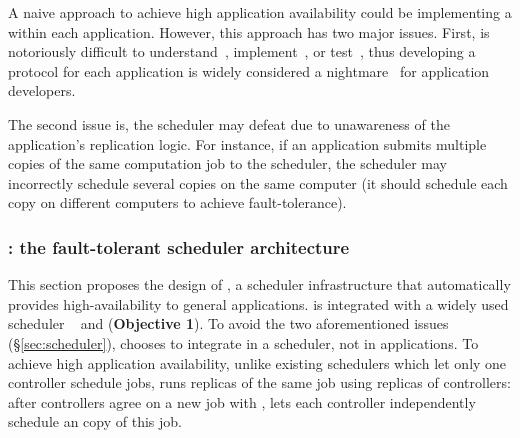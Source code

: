 A naive approach to achieve high application availability could be implementing 
a \paxos within each application. However, this approach has two major issues. 
First, \paxos is notoriously difficult to 
understand~\cite{raft:usenix14,paxos:simple}, implement~\cite{paxos:practical, 
paxos:live}, or test~\cite{modist:nsdi09,demeter:sosp11}, thus developing a 
\paxos protocol for each application is widely considered a 
nightmare~\cite{modist:nsdi09,demeter:sosp11,paxos:live} for application 
developers.

The second issue is, the scheduler may defeat \paxos due to unawareness of the 
application's \paxos replication logic. For instance, if an application submits 
multiple copies of the same computation job to the scheduler, the scheduler may 
incorrectly schedule several copies on the same computer (it should schedule 
each copy on different computers to achieve \paxos fault-tolerance).

\vspace{-.15in}\subsubsection{\tripod: the fault-tolerant scheduler 
architecture} 
\label{sec:scheduler-arch}\vspace{-.075in}

This section proposes the design of \tripod, a scheduler infrastructure that 
automatically provides high-availability to general applications. \tripod 
is integrated with a widely used scheduler \mesos~\cite{mesos:nsdi11} and 
\falcon (\textbf{Objective 1}). To avoid the two aforementioned issues 
(\S\ref{sec:scheduler}), \tripod chooses 
to integrate \paxos in a scheduler, not in applications. To achieve high
application availability, unlike existing schedulers which let only one 
controller schedule jobs, \tripod runs replicas of the same job using replicas 
of controllers: after controllers agree on a new job with \falcon, \tripod lets 
each controller independently schedule an copy of this job.



